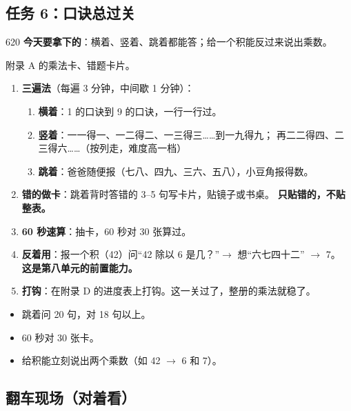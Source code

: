 \subsection{任务 6：口诀总过关}

\begin{lesson}{6}{20}
\textbf{今天要拿下的}：横着、竖着、跳着都能答；给一个积能反过来说出乘数。

\begin{materials}
附录 A 的乘法卡、错题卡片。
\end{materials}

\begin{enumerate}
  \item \textbf{三遍法}（每遍 3 分钟，中间歇 1 分钟）：
        \begin{enumerate}[label=第\arabic*遍：]
          \item \textbf{横着}：1 的口诀到 9 的口诀，一行一行过。
          \item \textbf{竖着}：一一得一、一二得二、一三得三……到一九得九；
                再二二得四、二三得六……（按列走，难度高一档）
          \item \textbf{跳着}：爸爸随便报（七八、四九、三六、五八），小豆角报得数。
        \end{enumerate}
  \item \textbf{错的做卡}：跳着背时答错的 3--5 句写卡片，贴镜子或书桌。
        \textbf{只贴错的，不贴整表。}
  \item \textbf{60 秒速算}：抽卡，60 秒对 30 张算过。
  \item \textbf{反着用}：报一个积（42）问“42 除以 6 是几？”$\to$ 想“六七四十二” $\to$ 7。
        \textbf{这是第八单元的前置能力。}
  \item \textbf{打钩}：在附录 D 的进度表上打钩。这一关过了，整册的乘法就稳了。
\end{enumerate}

\begin{passbox}
\begin{itemize}
  \item 跳着问 20 句，对 18 句以上。
  \item 60 秒对 30 张卡。
  \item 给积能立刻说出两个乘数（如 42 $\to$ 6 和 7）。
\end{itemize}
\end{passbox}
\end{lesson}

\subsection{翻车现场（对着看）}

